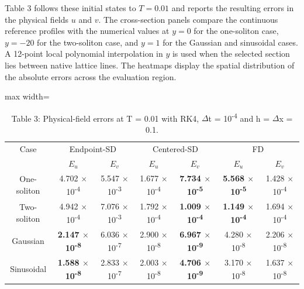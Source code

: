 \documentclass{article}
\theoremstyle{plain}
\theoremstyle{definition}
\begin{document}
Table 3 follows these initial states to \(T=0.01\) and reports the resulting errors in the physical fields \(u\) and \(v\). The cross-section panels compare the continuous reference profiles with the numerical values at \(y=0\) for the one-soliton case, \(y=-20\) for the two-soliton case, and \(y=1\) for the Gaussian and sinusoidal cases. A 12-point local polynomial interpolation in \(y\) is used when the selected section lies between native lattice lines. The heatmaps display the spatial distribution of the absolute errors across the evaluation region.

\begin{table}[!htbp]
\centering
\caption*{Table 3: Physical-field errors at T = 0.01 with RK4, \(\Delta\)t = 10\textsuperscript{-}\textsuperscript{4} and h = \(\Delta\)x = 0.1.}
\normalsize
\setlength{\tabcolsep}{6pt}
\renewcommand{\arraystretch}{1.25}\setlength{\extrarowheight}{1pt}
\setlength{\tabcolsep}{4pt}
\begin{adjustbox}{max width=\linewidth}
\begin{tabular}{ccccccc}

\hline
\multicolumn{1}{c}{Case} & \multicolumn{2}{c}{Endpoint-SD} & \multicolumn{2}{c}{Centered-SD} & \multicolumn{2}{c}{FD} \\
 & \multicolumn{1}{c}{\(E_u\)} & \multicolumn{1}{c}{\(E_v\)} & \multicolumn{1}{c}{\(E_u\)} & \multicolumn{1}{c}{\(E_v\)} & \multicolumn{1}{c}{\(E_u\)} & \multicolumn{1}{c}{\(E_v\)} \\
\hline
One-soliton & 4.702 \(\times\) 10\textsuperscript{-4} & 5.547 \(\times\) 10\textsuperscript{-3} & 1.677 \(\times\) 10\textsuperscript{-4} & \textbf{7.734 \(\times\) 10\textsuperscript{-5}} & \textbf{5.568 \(\times\) 10\textsuperscript{-5}} & 1.428 \(\times\) 10\textsuperscript{-4} \\
Two-soliton & 4.942 \(\times\) 10\textsuperscript{-4} & 7.076 \(\times\) 10\textsuperscript{-3} & 1.792 \(\times\) 10\textsuperscript{-4} & \textbf{1.009 \(\times\) 10\textsuperscript{-4}} & \textbf{1.149 \(\times\) 10\textsuperscript{-4}} & 1.694 \(\times\) 10\textsuperscript{-4} \\
Gaussian & \textbf{2.147 \(\times\) 10\textsuperscript{-8}} & 6.036 \(\times\) 10\textsuperscript{-7} & 2.900 \(\times\) 10\textsuperscript{-8} & \textbf{6.967 \(\times\) 10\textsuperscript{-9}} & 4.280 \(\times\) 10\textsuperscript{-8} & 2.206 \(\times\) 10\textsuperscript{-8} \\
Sinusoidal & \textbf{1.588 \(\times\) 10\textsuperscript{-8}} & 2.833 \(\times\) 10\textsuperscript{-7} & 2.003 \(\times\) 10\textsuperscript{-8} & \textbf{4.706 \(\times\) 10\textsuperscript{-9}} & 3.170 \(\times\) 10\textsuperscript{-8} & 1.637 \(\times\) 10\textsuperscript{-8} \\
\hline
\end{tabular}
\end{adjustbox}
\end{table}
\end{document}

